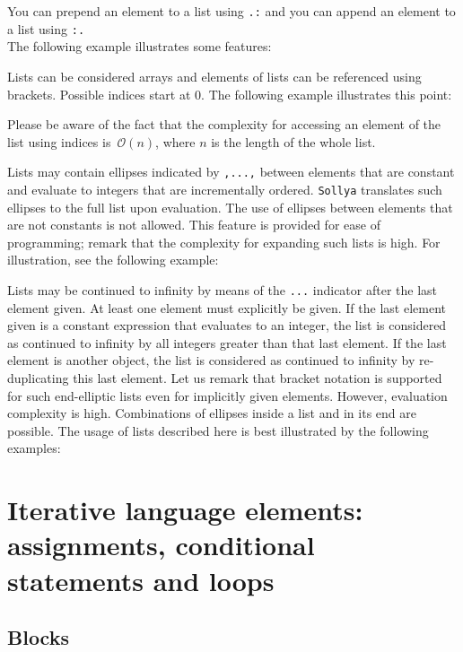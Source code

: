 \documentclass[a4paper]{article}
\newcommand{\com}[1]{\texttt{#1}}
\newcommand{\sollya}{\texttt{Sollya}\xspace}
\begin{document}
You can prepend an element to a list using \com{.:} and you can append an element to a list using \com{:.}\\ The following example illustrates some features:



Lists can be considered arrays and elements of lists can be
referenced using brackets. Possible indices start at $0$. The
following example illustrates this point:



Please be aware of the fact that the complexity for accessing an
element of the list using indices is~$\mathcal{O}(n)$, where $n$ is the length of the whole list.

Lists may contain ellipses indicated by \texttt{,...,} between
elements that are constant and evaluate to integers that are
incrementally ordered. \sollya translates such ellipses to the full
list upon evaluation. The use of ellipses between elements that are not
constants is not allowed. This feature is provided for ease of
programming; remark that the complexity for expanding such lists is
high. For illustration, see the following example:



Lists may be continued to infinity by means of the \texttt{...}
indicator after the last element given. At least one element must
explicitly be given. If the last element given is a constant
expression that evaluates to an integer, the list is considered as
continued to infinity by all integers greater than that last
element. If the last element is another object, the list is considered
as continued to infinity by re-duplicating this last element. Let us remark
that bracket notation is supported for such end-elliptic lists even
for implicitly given elements. However, evaluation complexity is
high. Combinations of ellipses inside a list and in its end are
possible. The usage of lists described here is best illustrated by the
following examples:



\section{Iterative language elements: assignments, conditional statements and loops}

\subsection{Blocks}
\end{document}
